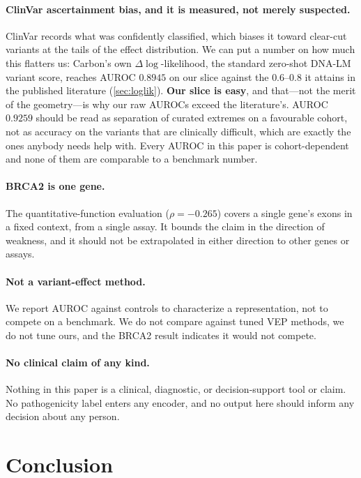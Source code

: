 \documentclass{article}
\begin{document}
\paragraph{ClinVar ascertainment bias, and it is measured, not merely suspected.} ClinVar records
what was confidently classified, which biases it toward clear-cut variants at the tails of the
effect distribution. We can put a number on how much this flatters us: Carbon's own
$\Delta\log$-likelihood, the standard zero-shot DNA-LM variant score, reaches AUROC $0.8945$ on our
slice against the $0.6$--$0.8$ it attains in the published literature (\cref{sec:loglik}). \textbf{Our
slice is easy}, and that---not the merit of the geometry---is why our raw AUROCs exceed the
literature's. AUROC $0.9259$ should be read as separation of curated extremes on a favourable
cohort, not as accuracy on the variants that are clinically difficult, which are exactly the ones
anybody needs help with. Every AUROC in this paper is cohort-dependent and none of them are
comparable to a benchmark number.

\paragraph{BRCA2 is one gene.} The quantitative-function evaluation ($\rho=-0.265$) covers a single
gene's exons in a fixed context, from a single assay. It bounds the claim in the direction of
weakness, and it should not be extrapolated in either direction to other genes or assays.

\paragraph{Not a variant-effect method.} We report AUROC against controls to characterize a
representation, not to compete on a benchmark. We do not compare against tuned VEP methods, we do
not tune ours, and the BRCA2 result indicates it would not compete.

\paragraph{No clinical claim of any kind.} Nothing in this paper is a clinical, diagnostic, or
decision-support tool or claim. No pathogenicity label enters any encoder, and no output here should
inform any decision about any person.

\section{Conclusion}
\label{sec:conclusion}
\end{document}
